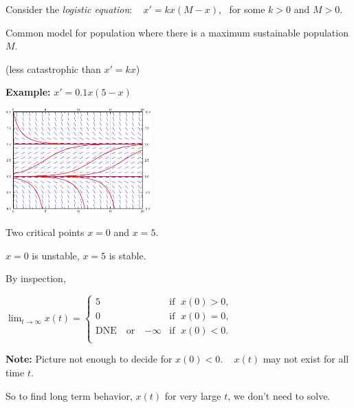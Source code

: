 \documentclass[10pt,aspectratio=169]{beamer}
\begin{document}
\begin{frame}

Consider the \emph{logistic equation}:
~
$x'= kx(M-x)$,~
for some $k > 0$ and $M > 0$.

\medskip
\pause

Common model for population where there is a maximum sustainable population $M$.

(less catastrophic than $x'=kx$)

\medskip
\pause

\textbf{Example:} $x' = 0.1 x(5-x)$

\vspace*{-\baselineskip}

\hspace*{3.1in} \includegraphics[width=2.2in]{../figures/2-2-logistic}

\vspace*{-1.4in}
\pause

Two critical points $x=0$ and $x=5$.

\pause
$x=0$ is unstable, \pause $x=5$ is stable.

\medskip
\pause

By inspection,

\medskip

$\displaystyle
\lim_{t\to \infty} x(t) = 
\begin{cases}
5 & \text{if } \; x(0) > 0 , \\
0 & \text{if } \; x(0) = 0 , \\
\text{DNE ~~or~~ } {-\infty} & \text{if } \; x(0) < 0 . \\
\end{cases}
$

\medskip
\pause

\textbf{Note:} Picture not enough to decide for $x(0) < 0$.
\pause
~
$x(t)$ may not exist for all time $t$.

\medskip
\pause

So to find long term behavior, $x(t)$ for very large $t$, we don't need to solve.

\end{frame}
\end{document}
